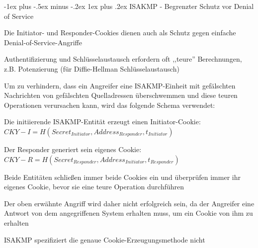 \documentclass[a4paper]{article}
\makeatletter
\renewcommand{\subsubsection}{\@startsection{subsubsection}{3}{0mm}%
 {-1ex plus -.5ex minus -.2ex}%
 {1ex plus .2ex}%
 {\normalfont\small\bfseries}}
\makeatother
\begin{document}
\begin{multicols}{3}
      \subsubsection{ISAKMP - Begrenzter Schutz vor Denial of Service}
      \begin{itemize*}
            \item Die Initiator- und Responder-Cookies dienen auch als Schutz gegen einfache Denial-of-Service-Angriffe
            \item Authentifizierung und Schlüsselaustausch erfordern oft ,,teure'' Berechnungen, z.B. Potenzierung (für Diffie-Hellman Schlüsselaustausch)
            \item Um zu verhindern, dass ein Angreifer eine ISAKMP-Einheit mit gefälschten Nachrichten von gefälschten Quelladressen überschwemmen und diese teuren Operationen verursachen kann, wird das folgende Schema verwendet:
            \begin{itemize*}
                  \item Die initiierende ISAKMP-Entität erzeugt einen Initiator-Cookie: $CKY-I = H(Secret_{Initiator}, Address_{Responder}, t_{Initiator})$
                  \item Der Responder generiert sein eigenes Cookie: $CKY-R = H(Secret_{Responder}, Address_{Initiator}, t_{Responder})$
                  \item Beide Entitäten schließen immer beide Cookies ein und überprüfen immer ihr eigenes Cookie, bevor sie eine teure Operation durchführen
                  \item Der oben erwähnte Angriff wird daher nicht erfolgreich sein, da der Angreifer eine Antwort von dem angegriffenen System erhalten muss, um ein Cookie von ihm zu erhalten
            \end{itemize*}
            \item ISAKMP spezifiziert die genaue Cookie-Erzeugungsmethode nicht
      \end{itemize*}


\end{multicols}
\end{document}
